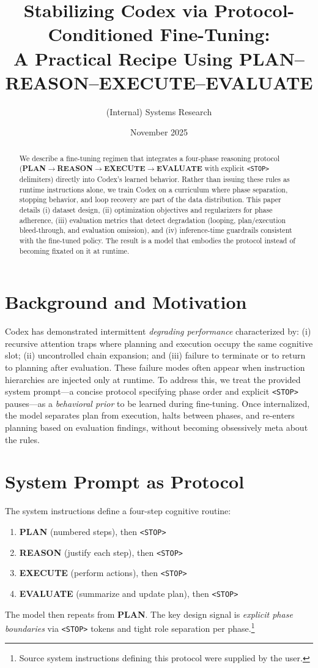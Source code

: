 \documentclass[11pt]{article}
\title{Stabilizing Codex via Protocol-Conditioned Fine-Tuning:\\
A Practical Recipe Using PLAN--REASON--EXECUTE--EVALUATE}
\author{(Internal) Systems Research}
\date{November 2025}
\begin{document}
\maketitle

\begin{abstract}
We describe a fine-tuning regimen that integrates a four-phase reasoning protocol
(\textbf{PLAN}$\rightarrow$\textbf{REASON}$\rightarrow$\textbf{EXECUTE}$\rightarrow$\textbf{EVALUATE} with explicit \texttt{<STOP>} delimiters)
directly into Codex's learned behavior. Rather than issuing these rules as
runtime instructions alone, we train Codex on a curriculum where phase separation,
stopping behavior, and loop recovery are part of the data distribution.
This paper details (i) dataset design, (ii) optimization objectives and regularizers
for phase adherence, (iii) evaluation metrics that detect degradation (looping,
plan/execution bleed-through, and evaluation omission), and (iv) inference-time
guardrails consistent with the fine-tuned policy. The result is a model that
embodies the protocol instead of becoming fixated on it at runtime.
\end{abstract}

\section{Background and Motivation}
Codex has demonstrated intermittent \emph{degrading performance} characterized by:
(i) recursive attention traps where planning and execution occupy the same cognitive
slot; (ii) uncontrolled chain expansion; and (iii) failure to terminate or to
return to planning after evaluation.
These failure modes often appear when instruction hierarchies are injected only at runtime.
To address this, we treat the provided system prompt---a concise protocol specifying
phase order and explicit \texttt{<STOP>} pauses---as a \emph{behavioral prior} to be learned during fine-tuning.
Once internalized, the model separates plan from execution, halts between phases,
and re-enters planning based on evaluation findings, without becoming obsessively
meta about the rules.

\section{System Prompt as Protocol}
The system instructions define a four-step cognitive routine:
\begin{enumerate}[leftmargin=2em]
  \item \textbf{PLAN} (numbered steps), then \texttt{<STOP>}
  \item \textbf{REASON} (justify each step), then \texttt{<STOP>}
  \item \textbf{EXECUTE} (perform actions), then \texttt{<STOP>}
  \item \textbf{EVALUATE} (summarize and update plan), then \texttt{<STOP>}
\end{enumerate}
The model then repeats from \textbf{PLAN}.
The key design signal is \emph{explicit phase boundaries} via \texttt{<STOP>} tokens and tight
role separation per phase.\footnote{Source system instructions defining this protocol were supplied by the user.}
\end{document}

